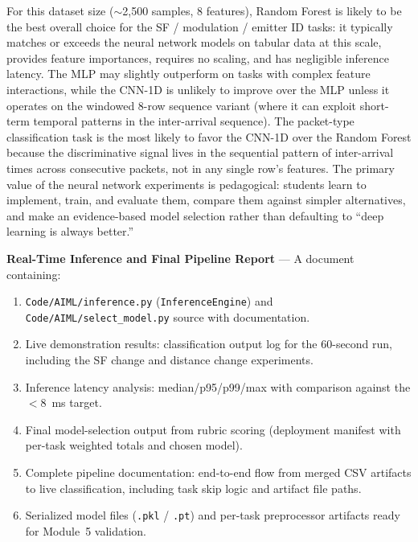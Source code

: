 \documentclass[11pt,letterpaper]{article}
\begin{document}
	\begin{tcolorbox}[infobox={Expected Outcome}]
		For this dataset size ($\sim$2{,}500 samples, 8 features), Random Forest is likely to be the best overall choice for the SF / modulation / emitter ID tasks: it typically matches or exceeds the neural network models on tabular data at this scale, provides feature importances, requires no scaling, and has negligible inference latency. The MLP may slightly outperform on tasks with complex feature interactions, while the CNN-1D is unlikely to improve over the MLP unless it operates on the windowed 8-row sequence variant (where it can exploit short-term temporal patterns in the inter-arrival sequence). The packet-type classification task is the most likely to favor the CNN-1D over the Random Forest because the discriminative signal lives in the sequential pattern of inter-arrival times across consecutive packets, not in any single row's features. The primary value of the neural network experiments is pedagogical: students learn to implement, train, and evaluate them, compare them against simpler alternatives, and make an evidence-based model selection rather than defaulting to ``deep learning is always better.''
	\end{tcolorbox}

	\begin{tcolorbox}[deliverable={Session 16 Deliverable}]
		\textbf{Real-Time Inference and Final Pipeline Report} --- A document containing:
		\begin{enumerate}
			\item \texttt{Code/AIML/inference.py} (\texttt{InferenceEngine}) and \texttt{Code/AIML/select\_model.py} source with documentation.
			\item Live demonstration results: classification output log for the 60-second run, including the SF change and distance change experiments.
			\item Inference latency analysis: median/p95/p99/max with comparison against the $<$8~ms target.
			\item Final model-selection output from rubric scoring (deployment manifest with per-task weighted totals and chosen model).
			\item Complete \ML{} pipeline documentation: end-to-end flow from merged CSV artifacts to live classification, including task skip logic and artifact file paths.
			\item Serialized model files (\texttt{.pkl} / \texttt{.pt}) and per-task preprocessor artifacts ready for Module~5 validation.
		\end{enumerate}
	\end{tcolorbox}
\end{document}
